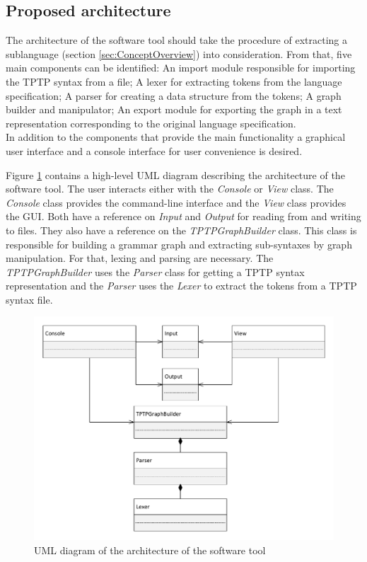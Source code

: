 \subsection{Proposed architecture}\label{sec:ConceptProposedArchitecture}
The architecture of the software tool should take the procedure of extracting a sublanguage (section \ref{sec:ConceptOverview}) into consideration.
From that, five main components can be identified:
An import module responsible for importing the \ac{TPTP} syntax from a file;
A lexer for extracting tokens from the language specification; A parser for creating a data structure from the tokens;
A graph builder and manipulator;
An export module for exporting the graph in a text representation corresponding to the original language specification.\\
In addition to the components that provide the main functionality a graphical user interface and a console interface for user convenience is desired.

Figure \ref{fig:ConceptArchitectureOverview} contains a high-level UML diagram describing the architecture of the software tool. The user interacts either with the \textit{Console} or \textit{View} class. The \textit{Console} class provides the command-line interface and the \textit{View} class provides the GUI. Both have a reference on \textit{Input} and \textit{Output} for reading from and writing to files. They also have a reference on the \textit{TPTPGraphBuilder} class. This class is responsible for building a grammar graph and extracting sub-syntaxes by graph manipulation. For that, lexing and parsing are necessary. The \textit{TPTPGraphBuilder} uses the \textit{Parser} class for getting a \ac{TPTP} syntax representation and the \textit{Parser} uses the \textit{Lexer} to extract the tokens from a \ac{TPTP} syntax file.
\begin{figure}[H]
\centering
\includegraphics[width=1\textwidth]{images/Concept_UML_Architecture_Overview.pdf}
\caption{UML diagram of the architecture of the software tool}
\label{fig:ConceptArchitectureOverview}
\end{figure}
